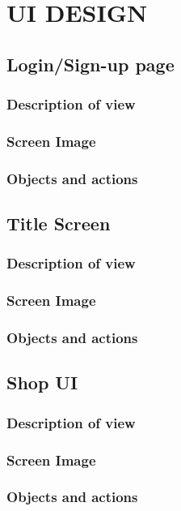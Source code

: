 \documentclass[11pt]{article}
\begin{document}
\section{UI DESIGN}

\subsection{Login/Sign-up page}
\subsubsection{Description of view}
\subsubsection{Screen Image}
\subsubsection{Objects and actions}

\subsection{Title Screen}
\subsubsection{Description of view}
\subsubsection{Screen Image}
\subsubsection{Objects and actions}

\subsection{Shop UI}
\subsubsection{Description of view}
\subsubsection{Screen Image}
\subsubsection{Objects and actions}
\end{document}
